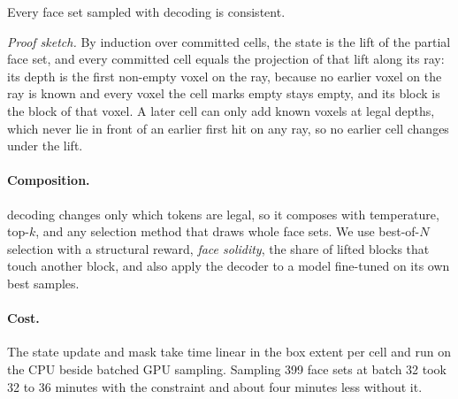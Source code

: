 \begin{proposition}
\label{prop:consistent}
Every face set sampled with \cfd{} decoding is consistent.
\end{proposition}
\emph{Proof sketch.} By induction over committed cells, the state is the lift of the partial face
set, and every committed cell equals the projection of that lift along its ray: its depth is the
first non-empty voxel on the ray, because no earlier voxel on the ray is known and every voxel the
cell marks empty stays empty, and its block is the block of that voxel. A later cell can only add
known voxels at legal depths, which never lie in front of an earlier first hit on any ray, so no
earlier cell changes under the lift. 

\paragraph{Composition.}
\cfd{} decoding changes only which tokens are legal, so it composes with temperature, top-$k$, and any
selection method that draws whole face sets. We use best-of-$N$ selection with a structural reward,
\emph{face solidity}, the share of lifted blocks that touch another block, and also apply the decoder to a
model fine-tuned on its own best samples. 

\paragraph{Cost.}
The state update and mask take time linear in the box extent per cell and run on the CPU beside
batched GPU sampling. Sampling 399 face sets at batch 32 took 32 to 36 minutes with the constraint and
about four minutes less without it.
